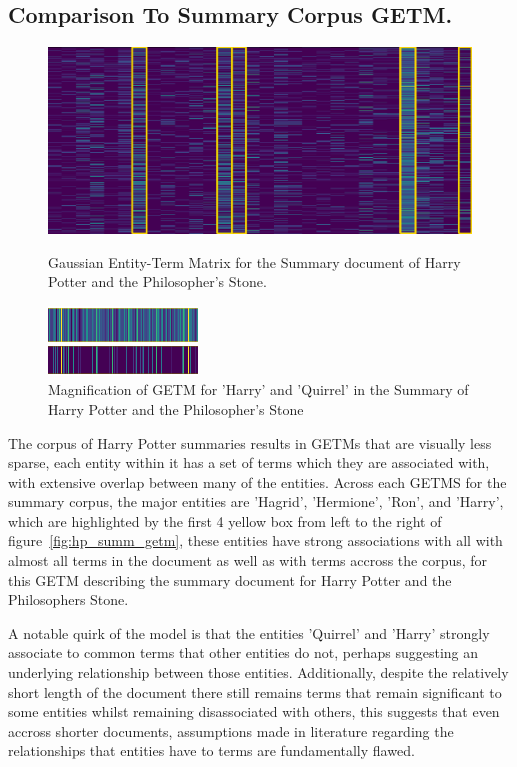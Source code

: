 \documentclass[10pt]{report}
\begin{document}
\subsection{Comparison To Summary Corpus GETM.}
\begin{figure}[h!]
  \centering
  \includegraphics[scale=0.4]{hp_getm_summ_vis}
\caption{Gaussian Entity-Term Matrix for the Summary document of Harry Potter and the Philosopher's Stone.\label{fig:hp_summ_getm}}
  \centering
  \includegraphics[scale=1.2]{harry_quirrel_compare}
\caption{Magnification of GETM for 'Harry' and 'Quirrel' in the Summary of Harry Potter and the Philosopher's Stone \label{fig:harry_quirrel_compare}}
\end{figure}
\renewcommand{\baselinestretch}{2.0}\normalsize
\renewcommand{\arraystretch}{1.0}
The corpus of Harry Potter summaries results in GETMs that are visually less sparse, each entity within it has a set of terms which they are associated with, with extensive overlap between many of the entities. Across each GETMS for the summary corpus, the major entities are 'Hagrid', 'Hermione', 'Ron', and 'Harry', which are highlighted by the first 4 yellow box from left to the right of figure~\ref{fig:hp_summ_getm}, these entities have strong associations with all with almost all terms in the document as well as with terms accross the corpus, for this GETM describing the summary document for Harry Potter and the Philosophers Stone.

A notable quirk of the model is that the entities 'Quirrel' and 'Harry' strongly associate to common terms that other entities do not, perhaps suggesting an  underlying relationship between those entities. Additionally, despite the relatively short length of the document there still remains terms that remain significant to some entities whilst remaining disassociated with others, this suggests that even accross shorter documents, assumptions made in literature regarding the relationships that entities have to terms are fundamentally flawed.
\end{document}
